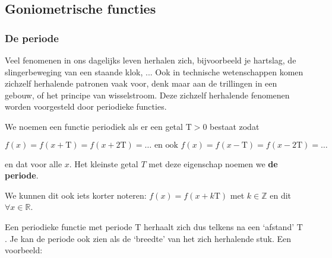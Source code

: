 


\subsection{Goniometrische functies}

\subsubsection{De periode}

Veel fenomenen in ons dagelijks leven herhalen zich, bijvoorbeeld
je hartslag, de slingerbeweging van een staande klok, ... Ook in technische
wetenschappen komen zichzelf herhalende patronen vaak voor, denk maar
aan de trillingen in een gebouw, of het principe van wisselstroom.
Deze zichzelf herhalende fenomenen worden voorgesteld door periodieke
functies.


We noemen een functie periodiek als er een getal $\textrm{T}>0$
bestaat zodat

\begin{equation*}
f(x)=f(x+\textrm{T})=f(x+2\textrm{T})=\ldots \text{ en ook } f(x)=f(x-\textrm{T})=f(x-2\textrm{T})=\ldots
\end{equation*}

en dat voor alle $x$. Het kleinste getal $T$ met deze eigenschap
noemen we \textbf{de periode}.

We kunnen dit ook iets korter noteren: $f(x)=f(x+k\textrm{T})$
met $k\in\mathbb{Z}$ en dit $\forall x\in\mathbb{R}$.


Een periodieke functie met periode $\textrm{T}$ herhaalt zich dus
telkens na een \textquoteleft afstand\textquoteright{} $\textrm{T}$.
Je kan de periode ook zien als de \textquoteleft breedte\textquoteright{}
van het zich herhalende stuk. Een voorbeeld:




\begin{figure}[H]
	\centering
	
\end{figure}

